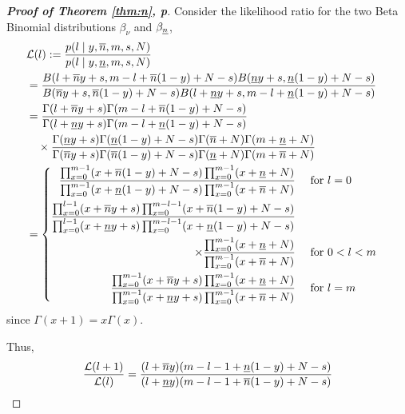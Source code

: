 \documentclass[12pt, a4paper]{elsarticle}
\begin{document}
\begin{proof}[\textbf{Proof of Theorem \ref{thm:n}, p\pageref{thm:n}}]
  \label{prf:n}
  Consider the likelihood ratio for the two Beta Binomial distributions $\beta_{\nu}$ and $\beta_{\underline{n}}$,
  \begin{align*}
    \lefteqn{\mathcal{L}(l) := \frac{p(l \mid y, \nu, m, s, N)}{p(l \mid y, \nl, m, s, N)}} \\
    &= \frac{B(l + \nu y + s, m - l + \nu (1 - y) + N - s) B(\nl y + s, \nl (1 - y) + N - s)}
            {B(\nu y + s, \nu (1 - y) + N - s) B(l + \nl y + s, m - l + \nl (1 - y) + N - s)} \\
    &= \frac{\Gamma(l + \nu y + s) \Gamma(m - l + \nu (1 - y) + N - s)}
            {\Gamma(l + \nl y + s) \Gamma(m - l + \nl (1 - y) + N - s)} \\
    &\quad \times \frac{\Gamma(\nl y + s) \Gamma(\nl (1 - y) + N - s) \Gamma(\nu+N) \Gamma(m+\nl+N)}
                       {\Gamma(\nu y + s) \Gamma(\nu (1 - y) + N - s)\Gamma(\nl+N) \Gamma(m+\nu+N)} \\
    &= \left\{ \begin{aligned}
         \frac{\prod_{x=0}^{m-1} (x + \nu (1 - y) + N - s) \prod_{x=0}^{m-1} (x + \nl + N)}
              {\prod_{x=0}^{m-1} (x + \nl (1 - y) + N - s) \prod_{x=0}^{m-1} (x + \nu + N)} &\quad\mbox{ for } l=0 \\
         \frac{\prod_{x=0}^{l-1} (x + \nu y + s) \prod_{x=0}^{m-l-1} (x + \nu (1 - y) + N - s)}
              {\prod_{x=0}^{l-1} (x + \nl y + s) \prod_{x=0}^{m-l-1} (x + \nl (1 - y) + N - s)} \\
         \quad \times \frac{\prod_{x=0}^{m-1} (x + \nl + N)}{\prod_{x=0}^{m-1} (x + \nu + N)} &\quad\mbox{ for } 0<l<m \\
         \frac{\prod_{x=0}^{m-1} (x + \nu y + s) \prod_{x=0}^{m-1} (x + \nl + N)}
              {\prod_{x=0}^{m-1} (x + \nl y + s) \prod_{x=0}^{m-1} (x + \nu + N)} &\quad\mbox{ for } l=m
       \end{aligned} \right.
  \end{align*}
  since $\Gamma(x+1)=x \Gamma(x)$.
  
  Thus,
  \[ \frac{\mathcal{L}(l+1)}{\mathcal{L}(l)} =
      \frac{(l + \overline{n} y) (m - l - 1 + \underline{n} (1 - y) + N - s)}
           {(l + \underline{n} y) (m - l - 1 + \overline{n} (1 - y) + N - s)}
  \]
  

\end{proof}
\end{document}
